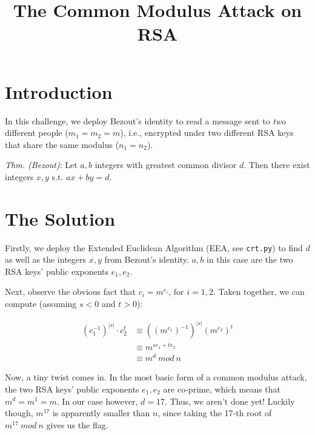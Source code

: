 \documentclass{article}
\title{The Common Modulus Attack on RSA}
\begin{document}
\maketitle

\section{Introduction}

In this challenge, we deploy Bezout's identity to read a message sent to \emph{two} different people ($m_1 = m_2 = m$), i.e., encrypted under two different RSA keys that share the same modulus ($n_1 = n_2$). 

\medskip

\emph{Thm. (Bezout)}: Let $a, b$ integers with greatest common divisor $d$. Then there exist integers $x, y$ s.t. $ax + by = d$.  

\section{The Solution}

Firstly, we deploy the Extended Euclidean Algorithm (EEA, see \texttt{crt.py}) to find $d$ as well as the integers $x, y$ from Bezout's identity. $a, b$ in this case are the two RSA keys' public exponents $e_1, e_2$.

\medskip

Next, observe the obvious fact that $c_i = m^{e_i}$, for $i = 1, 2$. 
Taken together, we can compute (assuming $s < 0$ and $t > 0$):

\begin{align*}
    (c_{1}^{-1})^{|s|}\cdot c_2^{t} &\equiv ((m^{e_1})^{-1})^{|s|}(m^{e_2})^{t}\\
                                    &\equiv m^{se_1 + te_2} \\
                                    &\equiv m^d \medspace mod \medspace n 
\end{align*}

Now, a tiny twist comes in. In the most basic form of a common modulus attack, the two RSA keys' public exponents $e_1, e_2$ are co-prime, which means that $m^d = m^1 = m$. In our case however, $d = 17$. Thus, we aren't done yet! Luckily though, $m^{17}$ is apparently smaller than $n$, since taking the 17-th root of $m^{17} \medspace mod \medspace n$ gives us the flag.
\end{document}
